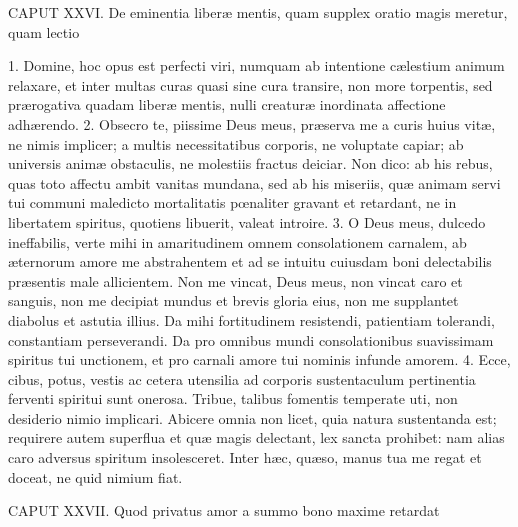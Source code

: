 \documentclass[twoside]{article}
\begin{document}
CAPUT XXVI.
De eminentia liberæ mentis, quam supplex oratio magis meretur, quam lectio

1. Domine, hoc opus est perfecti viri, numquam ab intentione cælestium animum relaxare, et inter multas curas quasi sine cura transire, non more torpentis, sed prærogativa quadam liberæ mentis, nulli creaturæ inordinata affectione adhærendo.
2. Obsecro te, piissime Deus meus, præserva me a curis huius vitæ, ne nimis implicer; a multis necessitatibus corporis, ne voluptate capiar; ab universis animæ obstaculis, ne molestiis fractus deiciar. Non dico: ab his rebus, quas toto affectu ambit vanitas mundana, sed ab his miseriis, quæ animam servi tui communi maledicto mortalitatis pœnaliter gravant et retardant, ne in libertatem spiritus, quotiens libuerit, valeat introire.
3. O Deus meus, dulcedo ineffabilis, verte mihi in amaritudinem omnem consolationem carnalem, ab æternorum amore me abstrahentem et ad se intuitu cuiusdam boni delectabilis præsentis male allicientem. Non me vincat, Deus meus, non vincat caro et sanguis, non me decipiat mundus et brevis gloria eius, non me supplantet diabolus et astutia illius. Da mihi fortitudinem resistendi, patientiam tolerandi, constantiam perseverandi. Da pro omnibus mundi consolationibus suavissimam spiritus tui unctionem, et pro carnali amore tui nominis infunde amorem.
4. Ecce, cibus, potus, vestis ac cetera utensilia ad corporis sustentaculum pertinentia ferventi spiritui sunt onerosa. Tribue, talibus fomentis temperate uti, non desiderio nimio implicari. Abicere omnia non licet, quia natura sustentanda est; requirere autem superflua et quæ magis delectant, lex sancta prohibet: nam alias caro adversus spiritum insolesceret. Inter hæc, quæso, manus tua me regat et doceat, ne quid nimium fiat.


CAPUT XXVII.
Quod privatus amor a summo bono maxime retardat
\end{document}
